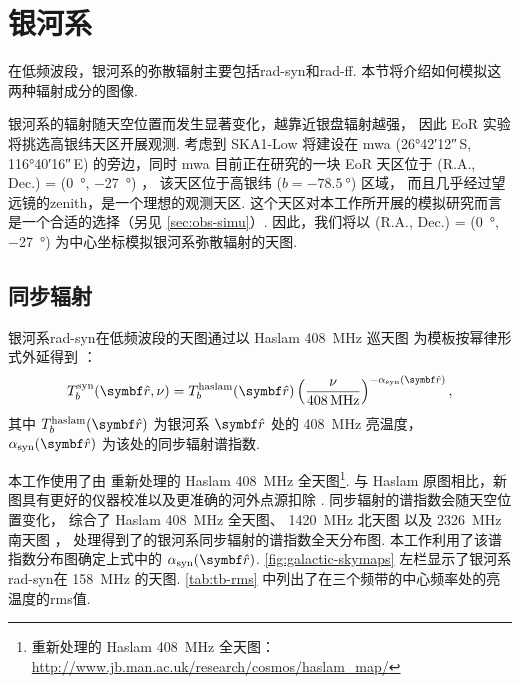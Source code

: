 \section{银河系}

在低频波段，银河系的弥散辐射主要包括\ac{rad-syn}和\ac{rad-ff}.
本节将介绍如何模拟这两种辐射成分的图像.

银河系的辐射随天空位置而发生显著变化，越靠近银盘辐射越强，
因此 EoR 实验将挑选高银纬天区开展观测.
考虑到 SKA1-Low 将建设在 \ac{mwa} (\ang{26;42;12}\,S, \ang{116;40;16}\,E)
的旁边，同时 \ac{mwa} 目前正在研究的一块 EoR 天区位于
(R.A., Dec.\@) = (\SI{0}{\degree}, \SI{-27}{\degree}) \cite{beardsley2016}，
该天区位于高银纬 ($b = \SI{-78.5}{\degree}$) 区域，
而且几乎经过望远镜的\ac{zenith}，是一个理想的观测天区.
这个天区对本工作所开展的模拟研究而言是一个合适的选择（另见 \autoref{sec:obs-simu}）.
因此，我们将以 (R.A., Dec.\@) = (\SI{0}{\degree}, \SI{-27}{\degree})
为中心坐标模拟银河系弥散辐射的天图.

\subsection{同步辐射}

银河系\ac{rad-syn}在低频波段的天图通过以
Haslam \SI{408}{\MHz} 巡天图\cite{haslam1982}
为模板按幂律形式外延得到 \cite{wang2010,bonaldi2015}：
\begin{equation}
  T_b^{\R{syn}}(\B{\hat{r}}, \nu)
    = T_b^{\R{haslam}}(\B{\hat{r}}) \left( \frac{\nu}{\SI{408}{\MHz}}
      \right)^{-\alpha_{\R{syn}}(\B{\hat{r}})} ,
\end{equation}
其中 $T_b^{\R{haslam}}(\B{\hat{r}})$ 为银河系 $\B{\hat{r}}$ 处的
\SI{408}{\MHz} 亮温度，
$\alpha_{\R{syn}}(\B{\hat{r}})$ 为该处的同步辐射谱指数.

本工作使用了由  重新处理的 Haslam \SI{408}{\MHz}
全天图\footnote{%
  重新处理的 Haslam \SI{408}{\MHz} 全天图：
  \url{http://www.jb.man.ac.uk/research/cosmos/haslam_map/}}.
与 Haslam 原图相比，新图具有更好的仪器校准以及更准确的河外点源扣除 \cite{remazeilles2015}.
同步辐射的谱指数会随天空位置变化，
 综合了 Haslam \SI{408}{\MHz} 全天图、
\SI{1420}{\MHz} 北天图 \cite{reich1986}
以及 \SI{2326}{\MHz} 南天图 \cite{jonas1998}，
处理得到了的银河系同步辐射的谱指数全天分布图.
本工作利用了该谱指数分布图确定上式中的 $\alpha_{\R{syn}}(\B{\hat{r}})$.
\autoref{fig:galactic-skymaps} 左栏显示了银河系\ac{rad-syn}在
\SI{158}{\MHz} 的天图.
\autoref{tab:tb-rms} 中列出了在三个频带的中心频率处的亮温度的\ac{rms}值.

